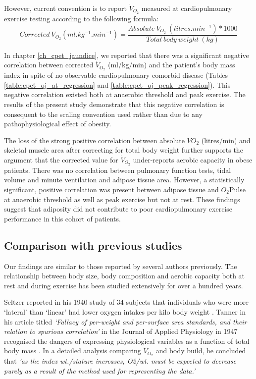 However, current convention is to report $\dot{V}_{O_2}$ measured at cardiopulmonary exercise testing according to the following formula: 
\[Corrected\ \dot{V}_{O_2} (ml.kg^{-1}.min^{-1}) = \frac{Absolute\ \dot{V}_{O_2}\ (litres.min^{-1}) * 1000}{Total\ body\ weight\ (kg)}\]

In chapter \ref{ch_cpet_jaundice}, we reported that there was a significant negative correlation between corrected $\dot{V}_{O_2}$ (ml/kg/min) and the patient's body mass index in spite of no observable cardiopulmonary comorbid disease (Tables \ref{table:cpet_oj_at_regression} and \ref{table:cpet_oj_peak_regression}). 
This negative correlation existed both at anaerobic threshold and peak exercise.
The results of the present study demonstrate that this negative correlation is consequent to the scaling convention used rather than due to any pathophysiological effect of obesity. 

The loss of the strong positive correlation between absolute $VO_{2}$ (litres/min) and skeletal muscle area after correcting for total body weight further supports the argument that the corrected value for $\dot{V}_{O_2}$ under-reports aerobic capacity in obese patients. 
There was no correlation between pulmonary function tests, tidal volume and minute ventilation and adipose tissue area. 
However, a statistically significant, positive correlation was present between adipose tissue and $O_2$Pulse at anaerobic threshold as well as peak exercise but not at rest.
These findings suggest that adiposity did not contribute to poor cardiopulmonary exercise performance in this cohort of patients.

\subsection{Comparison with previous studies}
Our findings are similar to those reported by several authors previously. 
The relationship between body size, body composition and aerobic capacity both at rest and during exercise has been studied extensively for over a hundred years.

Seltzer reported in his 1940 study of 34 subjects that individuals who were more `lateral' than `linear' had lower oxygen intakes per kilo body weight \parencite{seltzer_body_1940}.
Tanner in his article titled \textit{`Fallacy of per-weight and per-surface area standards, and their relation to spurious correlation'} in the Journal of Applied Physiology in 1947 recognised the dangers of expressing physiological variables as a function of total body mass \parencite{tanner_fallacy_1949}. 
In a detailed analysis comparing $\dot{V}_{O_2}$ and body build, he concluded that \textit{'as the index wt./stature increases, O2/wt. must be expected to decrease purely as a result of the method used for representing the data.'}

